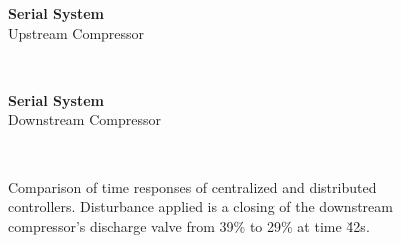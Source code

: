 \ifmakeplots
\begin{figure}
  {\centering\large\textbf{Serial System}\\ Upstream Compressor\\[1em]}
  \begin{subfigure}{0.48\linewidth}
    \footnotesize
    
    \normalsize
    \caption{}
    \label{fig:res:serial-timeresp:p1}
  \end{subfigure}
  \hfill
  \begin{subfigure}{0.48\linewidth}
    \footnotesize
    
    \normalsize
    \caption{}
    \label{fig:res:serial-timeresp:sd1}
  \end{subfigure}
  \\
  \begin{subfigure}{0.48\linewidth}
    \footnotesize
    
    \normalsize
    \caption{}
    \label{fig:res:serial-timeresp:td1}
  \end{subfigure}
  \hfill
  \begin{subfigure}{0.48\linewidth}
    \footnotesize
    
    \normalsize
    \caption{}
    \label{fig:res:serial-timeresp:ur1}
  \end{subfigure}
\end{figure}

\begin{figure}
  \ContinuedFloat
  {\centering\large\textbf{Serial System}\\ Downstream Compressor\\[1em]}
  \begin{subfigure}{0.40\linewidth}
    \centering
    \footnotesize
    
    \normalsize
    \caption{}
    \label{fig:res:serial-timeresp:p2}
  \end{subfigure}
  \hfill
  \begin{subfigure}{0.40\linewidth}
    \centering
    \footnotesize
    
    \normalsize
    \caption{}
    \label{fig:res:serial-timeresp:sd2}
  \end{subfigure}
  \\
  \begin{subfigure}{0.40\linewidth}
    \centering
    \footnotesize
    
    \normalsize
    \caption{}
    \label{fig:res:serial-timeresp:td2}
  \end{subfigure}
  \hfill
  \begin{subfigure}{0.40\linewidth}
    \centering
    \footnotesize
    
    \normalsize
    \caption{}
    \label{fig:res:serial-timeresp:ur2}
  \end{subfigure}

  \caption{Comparison of time responses of centralized and distributed controllers. Disturbance applied is a closing of the downstream compressor's discharge valve from 39\% to 29\% at time \u{42}{s}.}
  \label{fig:res:serial-timeresp}
\end{figure}

